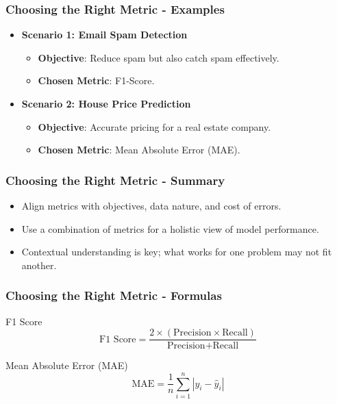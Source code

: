 \documentclass[aspectratio=169]{beamer}
\begin{document}
\begin{frame}[fragile]
    \frametitle{Choosing the Right Metric - Examples}
    \begin{itemize}
        \item \textbf{Scenario 1: Email Spam Detection}
            \begin{itemize}
                \item \textbf{Objective}: Reduce spam but also catch spam effectively.
                \item \textbf{Chosen Metric}: F1-Score.
            \end{itemize}

        \item \textbf{Scenario 2: House Price Prediction}
            \begin{itemize}
                \item \textbf{Objective}: Accurate pricing for a real estate company.
                \item \textbf{Chosen Metric}: Mean Absolute Error (MAE).
            \end{itemize}
    \end{itemize}
\end{frame}

\begin{frame}[fragile]
    \frametitle{Choosing the Right Metric - Summary}
    \begin{itemize}
        \item Align metrics with objectives, data nature, and cost of errors.
        \item Use a combination of metrics for a holistic view of model performance.
        \item Contextual understanding is key; what works for one problem may not fit another.
    \end{itemize}
\end{frame}

\begin{frame}[fragile]
    \frametitle{Choosing the Right Metric - Formulas}
    \begin{block}{F1 Score}
        \[
        \text{F1 Score} = \frac{2 \times (\text{Precision} \times \text{Recall})}{\text{Precision} + \text{Recall}}
        \]
    \end{block}
    
    \begin{block}{Mean Absolute Error (MAE)}
        \[
        \text{MAE} = \frac{1}{n} \sum_{i=1}^n |y_i - \hat{y}_i|
        \]
    \end{block}
\end{frame}
\end{document}
